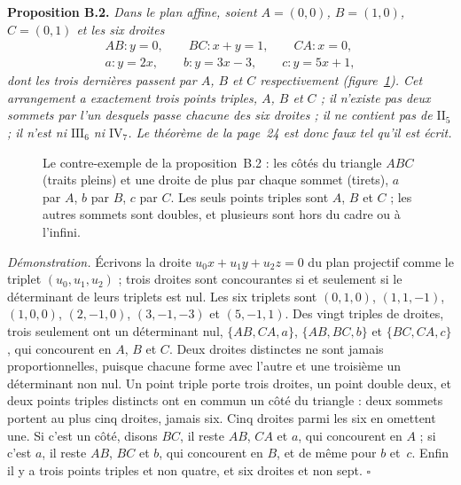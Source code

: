 \documentclass[11pt]{amsart}
\begin{document}
\medskip\noindent\textbf{Proposition B.2.} \emph{Dans le plan affine, soient $A = (0, 0)$, $B = (1, 0)$, $C = (0, 1)$ et les six droites}
\[
\begin{array}{c}
AB : y = 0, \qquad BC : x + y = 1, \qquad CA : x = 0,\\[2pt]
a : y = 2x, \qquad b : y = 3x - 3, \qquad c : y = 5x + 1,
\end{array}
\]
\emph{dont les trois dernières passent par $A$, $B$ et $C$ respectivement (figure~\ref{fig:80-six}). Cet arrangement a exactement trois points triples, $A$, $B$ et $C$ ; il n'existe pas deux sommets par l'un desquels passe chacune des six droites ; il ne contient pas de $\mathrm{II}_5$ ; il n'est ni $\mathrm{III}_6$ ni $\mathrm{IV}_7$. Le théorème de la page~24 est donc faux tel qu'il est écrit.}

\begin{figure}[htbp]
\centering
{}
\caption{Le contre-exemple de la proposition~B.2 : les côtés du triangle $ABC$ (traits pleins) et une droite de plus par chaque sommet (tirets), $a$ par $A$, $b$ par $B$, $c$ par $C$. Les seuls points triples sont $A$, $B$ et $C$ ; les autres sommets sont doubles, et plusieurs sont hors du cadre ou à l'infini.}
\label{fig:80-six}
\end{figure}

\medskip\noindent\emph{Démonstration.} Écrivons la droite $u_0x + u_1y + u_2z = 0$ du plan projectif comme le triplet $(u_0, u_1, u_2)$ ; trois droites sont concourantes si et seulement si le déterminant de leurs triplets est nul. Les six triplets sont $(0, 1, 0)$, $(1, 1, -1)$, $(1, 0, 0)$, $(2, -1, 0)$, $(3, -1, -3)$ et $(5, -1, 1)$. Des vingt triples de droites, trois seulement ont un déterminant nul, $\{AB, CA, a\}$, $\{AB, BC, b\}$ et $\{BC, CA, c\}$, qui concourent en $A$, $B$ et $C$. Deux droites distinctes ne sont jamais proportionnelles, puisque chacune forme avec l'autre et une troisième un déterminant non nul. Un point triple porte trois droites, un point double deux, et deux points triples distincts ont en commun un côté du triangle : deux sommets portent au plus cinq droites, jamais six. Cinq droites parmi les six en omettent une. Si c'est un côté, disons $BC$, il reste $AB$, $CA$ et $a$, qui concourent en $A$ ; si c'est $a$, il reste $AB$, $BC$ et $b$, qui concourent en $B$, et de même pour $b$ et~$c$. Enfin il y a trois points triples et non quatre, et six droites et non sept. $\square$
\end{document}
